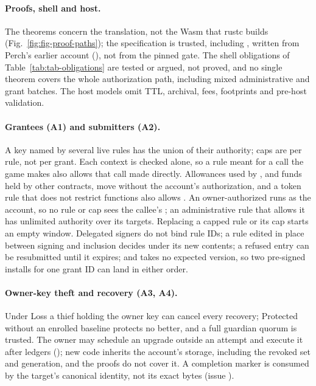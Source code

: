 \paragraph{Proofs, shell and host.} The theorems concern the translation, not
the Wasm that rustc  builds (Fig.~\ref{fig:fig-proof-paths});
the specification is trusted, including , written from Perch's
earlier account (), not from the pinned gate. The shell obligations of
Table~\ref{tab:tab-obligations} are tested or argued, not proved, and no single
theorem covers the whole authorization path, including mixed administrative and
grant batches. The host models omit TTL, archival, fees, footprints and pre-host
validation.

\paragraph{Grantees (A1) and submitters (A2).} A key named by several live rules
has the union of their authority; caps are per rule, not per grant. Each context
is checked alone, so a rule meant for a call the game makes also allows that call
made directly. Allowances used by , and funds held by other
contracts, move without the account's authorization, and a token rule that does
not restrict functions also allows . An owner-authorized
 runs as the account, so no rule or cap sees the callee's
; an administrative rule that allows it has unlimited
authority over its targets. Replacing a capped rule or its cap starts an empty
window. Delegated signers do not bind rule IDs; a rule edited in place between
signing and inclusion decides under its new contents; a refused entry can be
resubmitted until it expires; and  takes no expected version,
so two pre-signed installs for one grant ID can land in either order.

\paragraph{Owner-key theft and recovery (A3, A4).} Under Loss a thief holding
the owner key can cancel every recovery; Protected without an enrolled baseline
protects no better, and a full guardian quorum is trusted. The owner may schedule an upgrade outside an attempt and
execute it after  ledgers
(); new code inherits the account's storage, including
the revoked set and generation, and the proofs do not cover it. A completion
marker is consumed by the target's canonical identity, not its exact bytes
(issue ).

